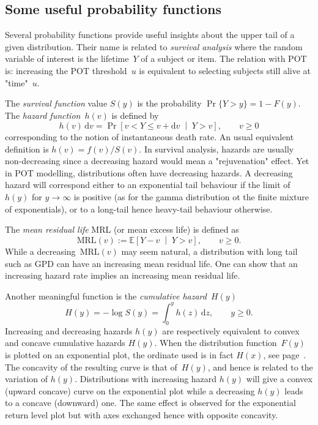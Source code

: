 \documentclass[a4paper]{report}
\newcommand{\Esp}{\mathbb{E}}
\newcommand{\bCond}[2]{\left[ #1 \;\middle\vert\; #2 \right]}
\begin{document}
\subsection{Some useful probability functions}
Several probability functions provide useful insights about the upper tail
of a given distribution. Their name is related to 
\textit{survival analysis} where the random variable 
of interest is the lifetime~$Y$ of a subject or item. 
The relation with POT is: increasing the POT threshold~$u$ is equivalent to 
selecting subjects still alive 
at "time"~$u$.

The \textit{survival function} value $S(y)$ is the probability $\Pr\{Y >y \} = 1-F(y)$. 
The \textit{hazard function}~$h(v)$ is defined by   
$$
   h(v)\,\textrm{d}v = \Pr\bCond{v < Y \leqslant v + \textrm{d}v }{Y > v },  \qquad v \geqslant 0
$$
corresponding to the notion of instantaneous death rate. An usual
equivalent definition is $h(v)=f(v)/S(v)$.  In
survival analysis, hazards are usually non-decreasing since a
decreasing hazard would mean a "rejuvenation" effect. Yet in POT
modelling, distributions often have decreasing hazards. A decreasing
hazard will correspond either to an exponential tail behaviour if the
limit of $h(y)$ for $y \to \infty$ is positive (as for the gamma distribution
ot the finite mixture of exponentials), or to a long-tail
hence heavy-tail behaviour otherwise.

The \textit{mean residual life} MRL (or mean excess life) is defined as
$$
  \textrm{MRL}(v) := \Esp\bCond{Y - v}{Y > v}, \qquad v \geqslant 0.
$$
While a decreasing~$\textrm{MRL}(v)$ may seem natural, a distribution
with long tail such as GPD can have an increasing mean residual
life. One can show that an increasing hazard rate implies an increasing
mean residual life.

Another meaningful function is the \textit{cumulative hazard}~$H(y)$ 
$$
   H(y) = - \log S(y) = \int_{0}^y h(z)\,\textrm{d}z,   \qquad y \geqslant 0.
$$
Increasing and decreasing hazards $h(y)$ are respectively equivalent
to convex and concave cumulative hazards $H(y)$. When the distribution
function~$F(y)$ is plotted on an exponential plot,
%
the ordinate used is in fact $H(x)$, see page~\pageref{FUNCPLOTS}.
The concavity of the resulting curve is that of~$H(y)$, and hence is
related to the variation of $h(y)$. Distributions with increasing
hazard $h(y)$ will give a convex (upward concave) curve on the
exponential plot while a decreasing $h(y)$ leads to a concave
(downward) one.  The same effect is observed for the exponential
return level plot but with axes exchanged hence with opposite
concavity.
\end{document}
